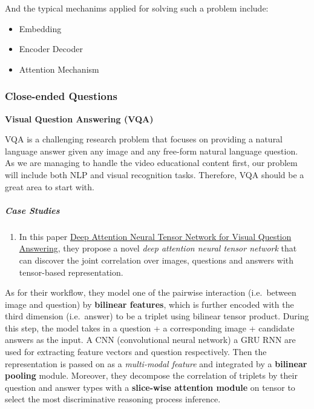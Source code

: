 \documentclass{acm_proc_article-sp}
\renewcommand{\paragraph}[1]{\vskip 6pt\noindent\textbf{#1 }}
\providecommand{\tightlist}{%
  \setlength{\itemsep}{0pt}\setlength{\parskip}{0pt}}
\begin{document}
And the typical mechanims applied for solving such a problem include:

\begin{itemize}
\item
  Embedding
\item
  Encoder Decoder
\item
  Attention Mechanism
\end{itemize}

\subsubsection{Close-ended Questions}\label{close-ended-questions}

\paragraph{Visual Question Answering
(VQA)}\label{visual-question-answering-vqa}

VQA is a challenging research problem that focuses on providing a
natural language answer given any image and any free-form natural
language question. As we are managing to handle the video educational
content first, our problem will include both NLP and visual recognition
tasks. Therefore, VQA should be a great area to start with.

\subparagraph{Case Studies}\label{case-studies-1}

\begin{enumerate}
\def\labelenumi{\arabic{enumi}.}
\tightlist
\item
  In this paper
  \href{http://openaccess.thecvf.com/content_ECCV_2018/papers/Yalong_Bai_Deep_Attention_Neural_ECCV_2018_paper.pdf}{Deep
  Attention Neural Tensor Network for Visual Question Answering}, they
  propose a novel \emph{deep attention neural tensor network} that can
  discover the joint correlation over images, questions and answers with
  tensor-based representation.
\end{enumerate}

As for their workflow, they model one of the pairwise interaction
(i.e.~between image and question) by \textbf{bilinear features}, which
is further encoded with the third dimension (i.e.~answer) to be a
triplet using bilinear tensor product. During this step, the model takes
in a question + a corresponding image + candidate answers as the input.
A CNN (convolutional neural network) a GRU RNN are used for extracting
feature vectors and question respectively. Then the representation is
passed on as a \emph{multi-modal feature} and integrated by a
\textbf{bilinear pooling} module. Moreover, they decompose the
correlation of triplets by their question and answer types with a
\textbf{slice-wise attention module} on tensor to select the most
discriminative reasoning process inference.
\end{document}
